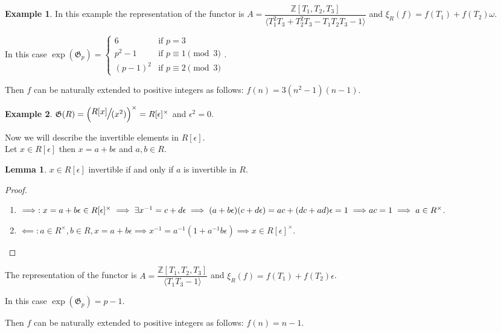 \documentclass{article}
\theoremstyle{definition}
\newtheorem{example}{Example}
\theoremstyle{definition}
\newtheorem{lemma}{Lemma}
\begin{document}
\begin{example}
In this example the representation of the functor is $A = \dfrac{\mathbb{Z}[T_1, T_2, T_3]}{\langle T_1^2T_3+T_2^2T_3-T_1T_2T_3-1\rangle}$ and $\xi_R(f)=f(T_1)+f(T_2)\omega$.

In this case $\operatorname{exp}(\mathfrak{G}_p) = \begin{cases} 
    6 & \text{if } p = 3\\
    p^2 - 1 & \text{if } p \equiv 1 \pmod{3}\\
    (p - 1)^2 & \text{if } p \equiv 2 \pmod{3}
\end{cases}.$

Then $f$ can be naturally extended to positive integers as follows: $f(n) = 3(n^2 - 1)(n - 1)$.
\end{example}

\begin{example}
    $\mathfrak{G}(R) = \Large{\left( \sfrac{R[x]}{ (x^2)}\right)^{\times}} =  R[\epsilon]^{\times}$ and $\epsilon^2 = 0$.

 Now we will describe the invertible elements in $R[\epsilon].$\\
    Let $x \in  R[\epsilon]$ then $x = a + b\epsilon$ and $a,b \in R.$
 \begin{lemma}
        $x \in R[\epsilon]$ invertible if and only if $a$ is invertible in $R$.
    \end{lemma}
\begin{proof}
\hspace*{5cm}
\begin{enumerate}
    \item $\implies: x = a + b\epsilon \in R[\epsilon]^{\times} \implies \exists x^{-1} = c + d\epsilon \implies (a+b\epsilon)(c +d\epsilon) = ac + (dc+ ad)\epsilon = 1 \implies\\
    ac = 1\implies a \in R^{\times}$.
    \item  $\impliedby: a \in R^{\times}, b \in R, x = a + b\epsilon \implies x^{-1} = a^{-1}(1 + a^{-1}b\epsilon) \implies x  \in R[\epsilon]^{\times}.$
\end{enumerate}
\end{proof}

The representation of the functor is $A = \dfrac{\mathbb{Z}[T_1, T_2, T_3]}{\langle T_1T_3-1\rangle}$ and $\xi_R(f)=f(T_1)+f(T_2)\epsilon$.

In this case $\operatorname{exp}(\mathfrak{G}_p) = p - 1.$

Then $f$ can be naturally extended to positive integers as follows: $f(n) = n - 1$.\\
\end{example}
\end{document}
